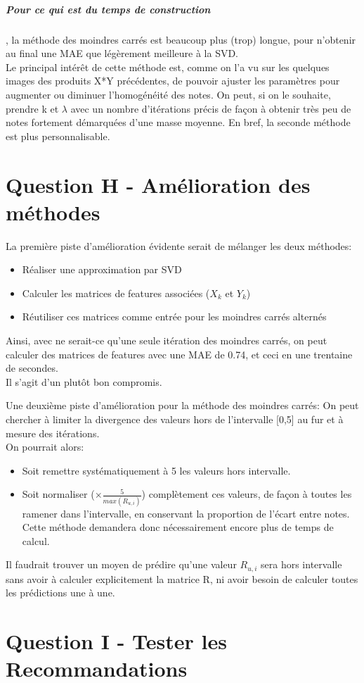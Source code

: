 \documentclass[12pt,a4paper]{article}
\begin{document}
\subparagraph{Pour ce qui est du temps de construction}, la méthode des moindres carrés est beaucoup plus (trop) longue, pour n'obtenir au final une MAE que légèrement meilleure à la SVD.\\

Le principal intérêt de cette méthode est, comme on l'a vu sur les quelques images des produits X*Y précédentes, de pouvoir ajuster les paramètres pour augmenter ou diminuer l'homogénéité des notes. On peut, si on le souhaite, prendre k et $\lambda$ avec un nombre d'itérations précis de façon à obtenir très peu de notes fortement démarquées d'une masse moyenne. En bref, la seconde méthode est plus personnalisable.

\section{Question H - Amélioration des méthodes}
La première piste d'amélioration évidente serait de mélanger les deux méthodes: 
\begin{itemize}
\item Réaliser une approximation par SVD
\item Calculer les matrices de features associées ($X_k$ et $Y_k$)
\item Réutiliser ces matrices comme entrée pour les moindres carrés alternés
\end{itemize}
Ainsi, avec ne serait-ce qu'une seule itération des moindres carrés, on peut calculer des matrices de features avec une MAE de 0.74, et ceci en une trentaine de secondes.\\
Il s'agit d'un plutôt bon compromis.\\

\vspace{1cm}

Une deuxième piste d'amélioration pour la méthode des moindres carrés: On peut chercher à limiter la divergence des valeurs hors de l'intervalle [0,5] au fur et à mesure des itérations.\\
On pourrait alors:
\begin{itemize}
\item Soit remettre systématiquement à 5 les valeurs hors intervalle.
\item Soit normaliser ($ \times \frac{5}{max(R_{u,i})}$) complètement ces valeurs, de façon à toutes les ramener dans l'intervalle, en conservant la proportion de l'écart entre notes. Cette méthode demandera donc nécessairement encore plus de temps de calcul.
\end{itemize}
Il faudrait trouver un moyen de prédire qu'une valeur $R_{u,i}$ sera hors intervalle sans avoir à calculer explicitement la matrice R, ni avoir besoin de calculer toutes les prédictions une à une.\\
 
 \section{Question I - Tester les Recommandations}
 
 
 
 
\end{document}
